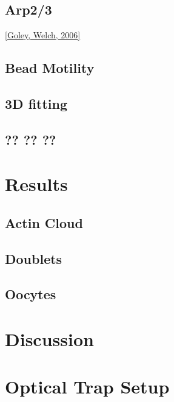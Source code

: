 \documentclass[A4paperpaper,11pt,english]{sphinxmanual}
\begin{document}
\section{Arp2/3}
\label{parts/part2:arp2-3}
{\hyperref[bibitem:goley2006]{{[}Goley, Welch,  2006{]}}}


\section{Bead Motility}
\label{parts/part2:bead-motility}

\section{3D fitting}
\label{parts/part2:d-fitting}

\section{?? ?? ??}
\label{parts/part2:id2}

\chapter{Results}
\label{parts/part3::doc}\label{parts/part3:results}

\section{Actin Cloud}
\label{parts/part3:actin-cloud}

\section{Doublets}
\label{parts/part3:doublets}

\section{Oocytes}
\label{parts/part3:oocytes}

\chapter{Discussion}
\label{parts/part4:discussion}\label{parts/part4::doc}

\chapter{Optical Trap Setup}
\label{parts/physicalparameters:physicalparameters}\label{parts/physicalparameters::doc}\label{parts/physicalparameters:optical-trap-setup}
\end{document}
